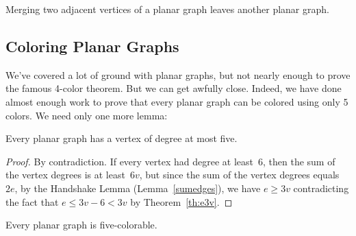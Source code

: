 \begin{theorem}\label{mergelem}
Merging two adjacent vertices of a planar graph leaves another planar
graph.
\end{theorem}

\subsection{Coloring Planar Graphs}

We've covered a lot of ground with planar graphs, but not nearly
enough to prove the famous 4-color theorem.  But we can get awfully
close.  Indeed, we have done almost enough work to prove that every
planar graph can be colored using only 5 colors.  We need only one
more lemma:
\begin{lemma}\label{lem:pg5}
Every planar graph has a vertex of degree at most five.
\end{lemma}

\begin{proof}
By contradiction.
If every vertex had degree at least~6, then the sum of the vertex
degrees is at least~$6v$, but since the sum of the vertex degrees
equals~$2e$, by the Handshake Lemma (Lemma~\ref{sumedges}), we have $e
\ge 3v$ contradicting the fact that $e \le 3v - 6 < 3v$ by
Theorem~\ref{th:e3v}.
\end{proof}

\begin{theorem}
Every planar graph is five-colorable.
\end{theorem}

